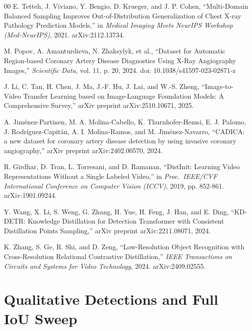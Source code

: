 \documentclass[conference]{IEEEtran}
\begin{document}
\begin{thebibliography}{00}
 E. Tetteh, J. Viviano, Y. Bengio, D. Krueger, and J. P. Cohen, ``Multi-Domain Balanced Sampling Improves Out-of-Distribution Generalization of Chest X-ray Pathology Prediction Models,'' in \textit{Medical Imaging Meets NeurIPS Workshop (Med-NeurIPS)}, 2021. arXiv:2112.13734.

 M. Popov, A. Amanturdieva, N. Zhaksylyk, et al., ``Dataset for Automatic Region-based Coronary Artery Disease Diagnostics Using X-Ray Angiography Images,'' \textit{Scientific Data}, vol. 11, p. 20, 2024. doi: 10.1038/s41597-023-02871-z

 J. Li, C. Tan, H. Chen, J. Ma, J.-F. Hu, J. Lai, and W.-S. Zheng, ``Image-to-Video Transfer Learning based on Image-Language Foundation Models: A Comprehensive Survey,'' arXiv preprint arXiv:2510.10671, 2025.

 A. Jiménez-Partinen, M. A. Molina-Cabello, K. Thurnhofer-Hemsi, E. J. Palomo, J. Rodríguez-Capitán, A. I. Molina-Ramos, and M. Jiménez-Navarro, ``CADICA: a new dataset for coronary artery disease detection by using invasive coronary angiography,'' arXiv preprint arXiv:2402.00570, 2024.

 R. Girdhar, D. Tran, L. Torresani, and D. Ramanan, ``DistInit: Learning Video Representations Without a Single Labeled Video,'' in \textit{Proc.\ IEEE/CVF International Conference on Computer Vision (ICCV)}, 2019, pp. 852-861. arXiv:1901.09244.

 Y. Wang, X. Li, S. Weng, G. Zhang, H. Yue, H. Feng, J. Han, and E. Ding, ``KD-DETR: Knowledge Distillation for Detection Transformer with Consistent Distillation Points Sampling,'' arXiv preprint arXiv:2211.08071, 2024.

 K. Zhang, S. Ge, R. Shi, and D. Zeng, ``Low-Resolution Object Recognition with Cross-Resolution Relational Contrastive Distillation,'' \textit{IEEE Transactions on Circuits and Systems for Video Technology}, 2024. arXiv:2409.02555.

\end{thebibliography}

\clearpage
\onecolumn
\appendices
\section{Qualitative Detections and Full IoU Sweep}
\label{app:appendix}
\end{document}
